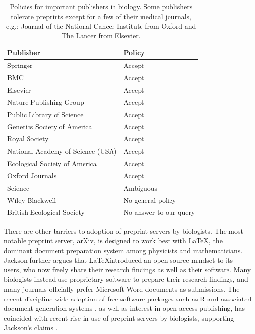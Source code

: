 \documentclass[letterpaper,twocolumn,superscriptaddress,showkeys]{revtex4}
\begin{document}
\begin{table}
    \centering
    \begin{tabular}{|ll|}
    \hline
    Publisher                                   & Policy \\
    \hline
    Springer                            	& Accept \\
    BMC                                 	& Accept \\
    Elsevier                            	& Accept \\
    Nature Publishing Group             	& Accept \\
    Public Library of Science           	& Accept \\
    Genetics Society of America                 & Accept \\
    Royal Society                       	& Accept \\
    National Academy of Science (USA)           & Accept \\
    Ecological Society of America       	& Accept \\
    Oxford Journals                             & Accept \\
    Science                             	& Ambiguous \\
    Wiley-Blackwell                       	& No general policy \\
    British Ecological Society                  & No answer to our query \\
    \hline
    \end{tabular}
    \caption{Policies for important publishers in biology. Some publishers
tolerate preprints except for a few of their medical journals, e.g.: Journal
of the National Cancer Institute from Oxford and The Lancer from Elsevier.}
    \label{table:policies}
\end{table}

There are other barriers to adoption of preprint servers by biologists.  The
most notable preprint server, arXiv, is designed to work best with \LaTeX, the
dominant document preparation system among physicists and mathematicians.
Jackson \cite{jackson2002preprints} further argues that \LaTeX introduced an
open source mindset to its users, who now freely share their research
findings as well as their software.  Many biologists instead use proprietary
software to prepare their research findings, and many journals officially prefer
Microsoft Word documents as submissions.  The recent discipline-wide adoption of
free software packages such as R and associated document generation systems
\cite{xie2012}, as well as interest in open access publishing, has coincided
with recent rise in use of preprint servers by biologists, supporting Jackson's
claims \cite{xie12}.
\end{document}
